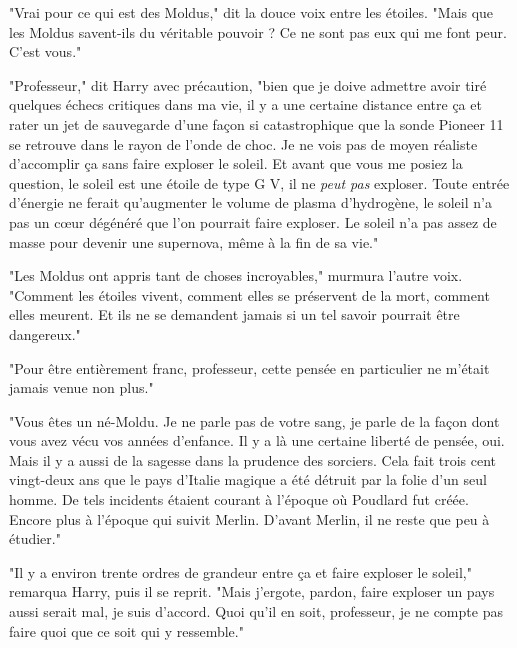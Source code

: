 "Vrai pour ce qui est des Moldus," dit la douce voix entre les étoiles. "Mais que les Moldus savent-ils du véritable pouvoir ? Ce ne sont pas eux qui me font peur. C'est vous."

"Professeur," dit Harry avec précaution, "bien que je doive admettre avoir tiré quelques échecs critiques dans ma vie, il y a une certaine distance entre ça et rater un jet de sauvegarde d'une façon si catastrophique que la sonde Pioneer 11 se retrouve dans le rayon de l'onde de choc. Je ne vois pas de moyen réaliste d'accomplir ça sans faire exploser le soleil. Et avant que vous me posiez la question, le soleil est une étoile de type G V, il ne \emph{peut pas}  exploser. Toute entrée d'énergie ne ferait qu'augmenter le volume de plasma d'hydrogène, le soleil n'a pas un cœur dégénéré que l'on pourrait faire exploser. Le soleil n'a pas assez de masse pour devenir une supernova, même à la fin de sa vie."

"Les Moldus ont appris tant de choses incroyables," murmura l'autre voix. "Comment les étoiles vivent, comment elles se préservent de la mort, comment elles meurent. Et ils ne se demandent jamais si un tel savoir pourrait être dangereux."

"Pour être entièrement franc, professeur, cette pensée en particulier ne m'était jamais venue non plus."

"Vous êtes un né-Moldu. Je ne parle pas de votre sang, je parle de la façon dont vous avez vécu vos années d'enfance. Il y a là une certaine liberté de pensée, oui. Mais il y a aussi de la sagesse dans la prudence des sorciers. Cela fait trois cent vingt-deux ans que le pays d'Italie magique a été détruit par la folie d'un seul homme. De tels incidents étaient courant à l'époque où Poudlard fut créée. Encore plus à l'époque qui suivit Merlin. D'avant Merlin, il ne reste que peu à étudier."

"Il y a environ trente ordres de grandeur entre ça et faire exploser le soleil," remarqua Harry, puis il se reprit. "Mais j'ergote, pardon, faire exploser un pays aussi serait mal, je suis d'accord. Quoi qu'il en soit, professeur, je ne compte pas faire quoi que ce soit qui y ressemble."

